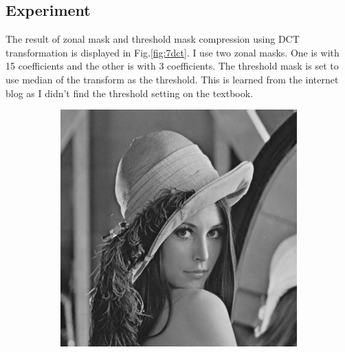 \subsection{Experiment}
The result of zonal mask and threshold mask compression using DCT transformation is displayed in Fig.\ref{fig:7dct}. I use two zonal masks. One is with 15 coefficients and the other is with 3 coefficients. The threshold mask is set to use median of the transform as the threshold. This is learned from the internet blog as I didn't find the threshold setting on the textbook.

\begin{figure}[h!]
	\centering
	\begin{subfigure}[b]{0.3\linewidth}
		\includegraphics[width=\linewidth]{myfigure/p7/lenna.png}
		\caption{}
		\label{fig:lenna}
	\end{subfigure}
	\begin{subfigure}[b]{0.3\linewidth}

\end{subfigure}
\end{figure}
